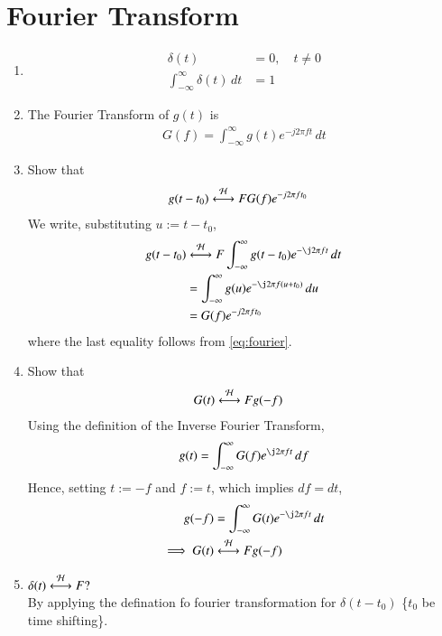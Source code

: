\documentclass[journal,12pt,twocolumn]{IEEEtran}
\renewcommand\thesection{\arabic{section}}
\begin{document}
\section{Fourier Transform}
\begin{enumerate}[label=\thesection.\arabic*
	,ref=\thesection.\theenumi]

	\item 
\begin{align}
	\delta(t)&=0, \quad t\neq 0 \\
	\int_{-\infty}^{\infty}\delta(t) \, dt&= 1
\end{align}
\item The Fourier Transform of $g(t)$ is
\begin{align}
G(f)=\int_{-\infty}^{\infty}g(t)e^{-j2\pi ft}\,dt
\label{eq:fourier}
\end{align}
\item Show that 
\begin{align}
    g(t-t_0)&\overset{\mathcal{H}}{ \longleftrightarrow}{F}G(f)e^{-j2\pi ft_0}
    \label{eq:t-shift}
\end{align}
\solution We write, substituting $u := t-t_0$,
\begin{align}
    g(t-t_0)&\system{F}\int_{-\infty}^{\infty}
            g(t-t_0)e^{-\j2\pi ft}\,dt \\
            &=\int_{-\infty}^{\infty}
            g(u)e^{-\j2\pi f(u + t_0)}\,du \\
            &=G(f)e^{-j2\pi ft_0}
\end{align}
where the last equality follows from \eqref{eq:fourier}.
\item Show that
\begin{align} \label{duality}
    G(t)&\overset{\mathcal{H}}{ \longleftrightarrow}{F}g(-f)
\end{align}
\solution Using the definition of the Inverse Fourier Transform,
\begin{align}
    g(t)=\int_{-\infty}^{\infty}G(f)e^{\j2\pi ft}\,df
    \label{eq:duality}
\end{align}
Hence, setting $t := -f$ and $f := t$, which implies $df = dt$,
\begin{align}
    g(-f)&=\int_{-\infty}^{\infty}G(t)e^{-\j2\pi ft}\,dt \\
    \implies G(t)&\system{F}g(-f)
\end{align}
	 \item $\delta(t)\overset{\mathcal{H}}{ \longleftrightarrow}{F}?$\\
	 \solution By applying the defination fo fourier transformation for $\delta(t-t_0)$ \{$t_0$ be time shifting\}.
	 \begin{align}

\end{align}
\end{enumerate}
\end{document}
